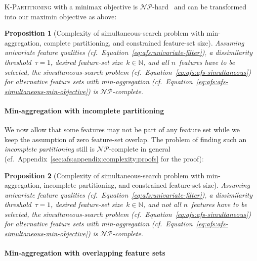 \documentclass{article}
\newtheorem{proposition}{Proposition}
\theoremstyle{definition}
\begin{document}
\textsc{K-Partitioning} with a minimax objective is $\mathcal{NP}$-hard~\cite{babel1998thek} and
can be transformed into our maximin objective as above:
%
\begin{proposition}[Complexity of simultaneous-search problem with min-aggregation, complete partitioning, and constrained feature-set size]
	Assuming univariate feature qualities (cf.~Equation~\ref{eq:afs:univariate-filter}), a dissimilarity threshold~$\tau = 1$, desired feature-set size~$k \in \mathbb{N}$, and all $n$~features have to be selected, the simultaneous-search problem (cf.~Equation~\ref{eq:afs:afs-simultaneous}) for alternative feature sets with min-aggregation (cf.~Equation~\ref{eq:afs:afs-simultaneous-min-objective}) is $\mathcal{NP}$-complete.
	\label{prop:afs:complexity-partitioning-min-constrained-k}
\end{proposition}

\paragraph{Min-aggregation with incomplete partitioning}

We now allow that some features may not be part of any feature set while we keep the assumption of zero feature-set overlap.
The problem of finding such an \emph{incomplete partitioning} still is $\mathcal{NP}$-complete in general (cf.~Appendix~\ref{sec:afs:appendix:complexity:proofs} for the proof):
%
\begin{proposition}[Complexity of simultaneous-search problem with min-aggregation, incomplete partitioning, and constrained feature-set size]
	Assuming univariate feature qualities (cf.~Equation~\ref{eq:afs:univariate-filter}), a dissimilarity threshold~$\tau = 1$, desired feature-set size~$k \in \mathbb{N}$, and \emph{not} all $n$~features have to be selected, the simultaneous-search problem (cf.~Equation~\ref{eq:afs:afs-simultaneous}) for alternative feature sets with min-aggregation (cf.~Equation~\ref{eq:afs:afs-simultaneous-min-objective}) is $\mathcal{NP}$-complete.
	\label{prop:afs:complexity-incomplete-partitioning-min-constrained-k}
\end{proposition}

\paragraph{Min-aggregation with overlapping feature sets}
\end{document}

